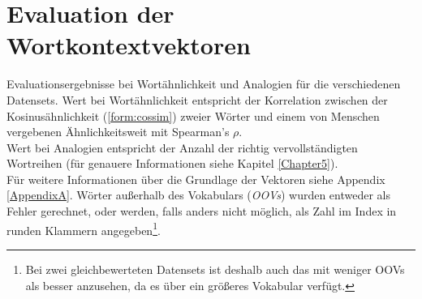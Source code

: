
\chapter{Evaluation der Wortkontextvektoren} %

\label{AppendixB} %

Evaluationsergebnisse bei Wortähnlichkeit und Analogien für die verschiedenen Datensets.
Wert bei Wortähnlichkeit entspricht der Korrelation zwischen der Kosinusähnlichkeit (\ref{form:cossim}) zweier Wörter und
einem von Menschen vergebenen Ähnlichkeitsweit mit Spearman's $\rho$.\\
Wert bei Analogien entspricht der Anzahl der richtig vervollständigten Wortreihen (für genauere Informationen siehe
Kapitel \ref{Chapter5}).\\
Für weitere Informationen über die Grundlage der Vektoren siehe Appendix \ref{AppendixA}.
Wörter außerhalb des Vokabulars (\emph{OOVs}) wurden entweder als Fehler gerechnet, oder
werden, falls anders nicht möglich, als Zahl im Index in runden Klammern angegeben\footnote{Bei zwei gleichbewerteten
Datensets ist deshalb auch das mit weniger OOVs als besser anzusehen, da es über ein größeres Vokabular verfügt.}.

